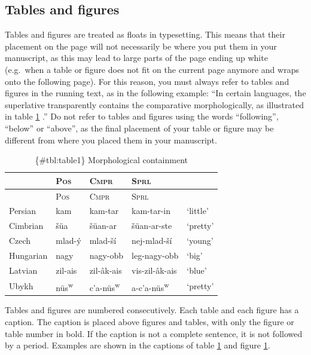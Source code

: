 \documentclass[cm,linguex]{glossa}
\begin{document}
\hypertarget{tables-and-figures}{%
\subsection{Tables and figures}\label{tables-and-figures}}

Tables and figures are treated as floats in typesetting. This means that
their placement on the page will not necessarily be where you put them
in your manuscript, as this may lead to large parts of the page ending
up white (e.g.~when a table or figure does not fit on the current page
anymore and wraps onto the following page). For this reason, you must
always refer to tables and figures in the running text, as in the
following example: ``In certain languages, the superlative transparently
contains the comparative morphologically, as illustrated in table
\protect\hyperlink{tbl:table1}{1} \citep[ 46]{Bobaljik2012}.'' Do not
refer to tables and figures using the words ``following'', ``below'' or
``above'', as the final placement of your table or figure may be
different from where you placed them in your manuscript.

\begin{longtable}[]{@{}lllll@{}}
\caption{\{\#tbl:table1\} Morphological containment}\tabularnewline
\toprule\noalign{}
& \textsc{Pos} & \textsc{Cmpr} & \textsc{Sprl} & \\
\midrule\noalign{}
\endfirsthead
\toprule\noalign{}
& \textsc{Pos} & \textsc{Cmpr} & \textsc{Sprl} & \\
\midrule\noalign{}
\endhead
\bottomrule\noalign{}
\endlastfoot
Persian & kam & kam-tar & kam-tar-in & `little' \\
Cimbrian & šüa & šüan-ar & šüan-ar-ste & `pretty' \\
Czech & mlad-ý & mlad-ší & nej-mlad-ší & `young' \\
Hungarian & nagy & nagy-obb & leg-nagy-obb & `big' \\
Latvian & zil-ais & zil-âk-ais & vis-zil-âk-ais & `blue' \\
Ubykh & nüs\textsuperscript{w} & c'a-nüs\textsuperscript{w} &
a-c'a-nüs\textsuperscript{w} & `pretty' \\
\end{longtable}

Tables and figures are numbered consecutively. Each table and each
figure has a caption. The caption is placed above figures and tables,
with only the figure or table number in bold. If the caption is not a
complete sentence, it is not followed by a period. Examples are shown in
the captions of table \protect\hyperlink{tbl:table1}{1} and figure
\protect\hyperlink{fig:glossalogo}{1}.
\end{document}
